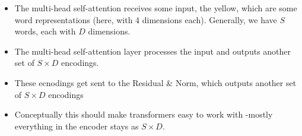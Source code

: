 \documentclass[11pt]{article}
\begin{document}
\begin{minipage}[l]{.5\linewidth}
    \begin{figure}[H]
        \centering
    \end{figure}
\end{minipage}\hfill
\begin{minipage}[r]{.45\linewidth}
    \begin{itemize}
        \item The multi-head self-attention receives some input, the yellow, which are some word representations (here, with 4 dimensions each). Generally, we have $S$ words, each with $D$ dimensions.
        \item The multi-head self-attention layer processes the input and outputs another set of $S\times D$ encodings. 
        \item These ecnodings get sent to the Residual \& Norm, which outputs another set of $S\times D$ encodings 
        \item Conceptually this should make transformers easy to work with -mostly everything in the encoder stays as $S \times D$.
    \end{itemize}
\end{minipage}
\end{document}
